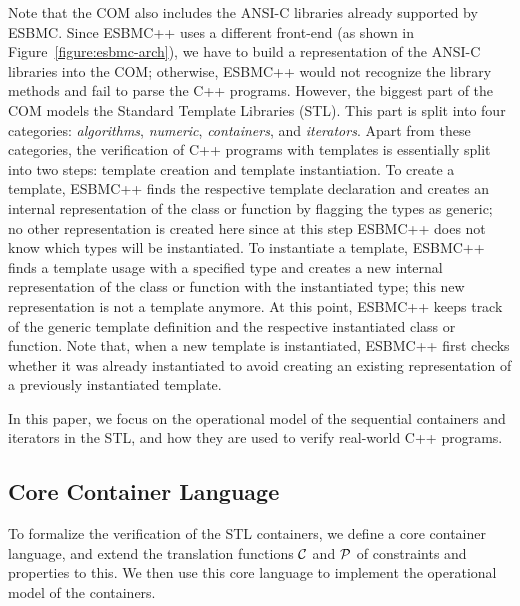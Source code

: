 \documentclass[conference]{IEEEtran}
\begin{document}
Note that the COM also includes the ANSI-C libraries already
supported by ESBMC. Since ESBMC++ uses a different front-end
(as shown in Figure~\ref{figure:esbmc-arch}), we have to build
a representation of the ANSI-C libraries into the COM; otherwise, ESBMC++ would
not recognize the library methods and fail to parse the C++ programs.
%
However, the biggest part of the COM models
the Standard Template Libraries (STL).
This part is split into
four categories: \textit{algorithms}, \textit{numeric},
\textit{containers}, and \textit{iterators}.
Apart from these categories, the verification of C++ programs with
templates is essentially split into two steps: template creation
and template instantiation. To create a template, ESBMC++ finds
the respective template declaration and creates an internal representation
of the class or function by flagging the types as generic; no other representation
is created here since at this step ESBMC++ does not know which types will be
instantiated. To instantiate a template, ESBMC++ finds a template usage
with a specified type and creates a new internal representation of the
class or function with the instantiated type; this new representation
is not a template anymore. At this point, ESBMC++ keeps track of the
generic template definition and the respective instantiated class or function.
Note that, when a new template is instantiated, ESBMC++ first checks whether it was already
instantiated to avoid creating an existing representation of a previously
instantiated template.

In this paper, we focus on the operational model of the
sequential containers and iterators in the STL,
and how they are used to
verify real-world C++ programs.



\subsection{Core Container Language}

To formalize the verification of the STL containers,
we define a core container language, and extend the translation
functions $\cal C$ and  $\cal P$ of constraints and properties to this.
We then use this core language to implement the operational model
of the containers.
\end{document}
